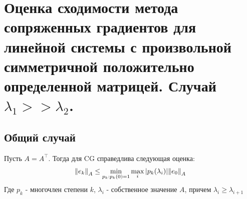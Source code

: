 \section{Оценка сходимости метода сопряженных градиентов для линейной системы с произвольной симметричной положительно определенной матрицей. Случай $\lambda_1 >> \lambda_2$.}

\subsection{Общий случай}

\begin{theorem*}
	Пусть $A = A^\top$. Тогда для CG справедлива следующая оценка:
	$$\norm[A]{e_k} \le \min_{p_k:p_k(0) = 1} \max_i |p_k(\lambda_i)|\norm[A]{e_0}$$
	Где $p_k$ - многочлен степени $k$, $\lambda_i$ - собственное значение $A$, причем $\lambda_{i} \ge \lambda_{i+1}$
\end{theorem*}

